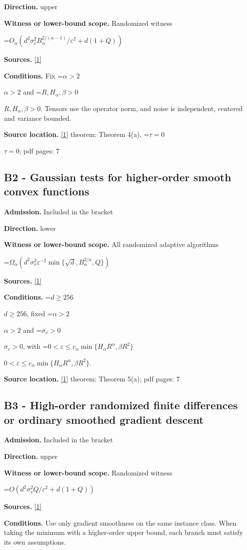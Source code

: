 \documentclass[10pt,a4paper]{article}
\newcommand{\AtlasMath}[1]{\par\begingroup\centering\setbox0=\hbox{$\displaystyle #1$}\ifdim\wd0>1.4\linewidth\typeout{ATLAS WIDE FORMULA: \the\wd0}\fi\ifdim\wd0>\linewidth\resizebox{\linewidth}{!}{\box0}\else\box0\fi\par\endgroup}
\newcommand{\AtlasInlineMath}[1]{\begingroup\setbox0=\hbox{$#1$}\ifdim\wd0>.4\linewidth\endgroup\AtlasMath{#1}\else\endgroup$#1$\fi}
\begin{document}
\textbf{Direction.} upper

\textbf{Witness or lower-bound scope.} Randomized witness

\AtlasMath{O_\alpha(d^2\sigma_v^2 B_\alpha^{2/(\alpha-1)}/\varepsilon^2+d(1+Q))}
\textbf{Sources.} \href{https://arxiv.org/pdf/2610.05517v2}{[1]}

\textbf{Conditions.} Fix \AtlasInlineMath{\alpha>2} and \AtlasInlineMath{R,H_\alpha,\beta>0}. Tensors use the operator norm, and noise is independent, centered and variance bounded.

\textbf{Source location.} \href{https://arxiv.org/pdf/2610.05517v2}{[1]} theorem: Theorem 4(a), \AtlasInlineMath{\tau=0}; pdf pages: 7

\subsection{B2 - Gaussian tests for higher-order smooth convex functions}
\textbf{Admission.} Included in the bracket

\textbf{Direction.} lower

\textbf{Witness or lower-bound scope.} All randomized adaptive algorithms

\AtlasMath{\Omega_\alpha(d^2\sigma_v^2\varepsilon^{-2}\min\{\sqrt d,B_\alpha^{2/\alpha},Q\})}
\textbf{Sources.} \href{https://arxiv.org/pdf/2610.05517v2}{[1]}

\textbf{Conditions.} \AtlasInlineMath{d\ge256}, fixed \AtlasInlineMath{\alpha>2} and \AtlasInlineMath{\sigma_v>0}, with \AtlasInlineMath{0<\varepsilon\le c_\alpha\min\{H_\alpha R^\alpha,\beta R^2\}}.

\textbf{Source location.} \href{https://arxiv.org/pdf/2610.05517v2}{[1]} theorem: Theorem 5(a); pdf pages: 7

\subsection{B3 - High-order randomized finite differences or ordinary smoothed gradient descent}
\textbf{Admission.} Included in the bracket

\textbf{Direction.} upper

\textbf{Witness or lower-bound scope.} Randomized witness

\AtlasMath{O(d^2\sigma_v^2 Q/\varepsilon^2+d(1+Q))}
\textbf{Sources.} \href{https://arxiv.org/pdf/2610.05517v2}{[1]}

\textbf{Conditions.} Use only gradient smoothness on the same instance class. When taking the minimum with a higher-order upper bound, each branch must satisfy its own assumptions.
\end{document}
